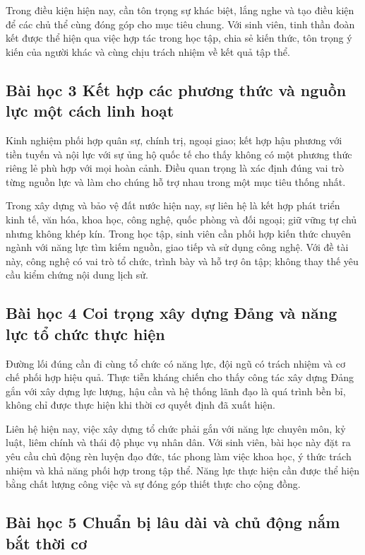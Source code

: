 Trong điều kiện hiện nay, cần tôn trọng sự khác biệt, lắng nghe và tạo điều kiện để các chủ thể cùng đóng góp cho mục tiêu chung. Với sinh viên, tinh thần đoàn kết được thể hiện qua việc hợp tác trong học tập, chia sẻ kiến thức, tôn trọng ý kiến của người khác và cùng chịu trách nhiệm về kết quả tập thể.

\subsection{Bài học 3 Kết hợp các phương thức và nguồn lực một cách linh hoạt}

Kinh nghiệm phối hợp quân sự, chính trị, ngoại giao; kết hợp hậu phương với tiền tuyến và nội lực với sự ủng hộ quốc tế cho thấy không có một phương thức riêng lẻ phù hợp với mọi hoàn cảnh. Điều quan trọng là xác định đúng vai trò từng nguồn lực và làm cho chúng hỗ trợ nhau trong một mục tiêu thống nhất.

Trong xây dựng và bảo vệ đất nước hiện nay, sự liên hệ là kết hợp phát triển kinh tế, văn hóa, khoa học, công nghệ, quốc phòng và đối ngoại; giữ vững tự chủ nhưng không khép kín. Trong học tập, sinh viên cần phối hợp kiến thức chuyên ngành với năng lực tìm kiếm nguồn, giao tiếp và sử dụng công nghệ. Với đề tài này, công nghệ có vai trò tổ chức, trình bày và hỗ trợ ôn tập; không thay thế yêu cầu kiểm chứng nội dung lịch sử.

\subsection{Bài học 4 Coi trọng xây dựng Đảng và năng lực tổ chức thực hiện}

Đường lối đúng cần đi cùng tổ chức có năng lực, đội ngũ có trách nhiệm và cơ chế phối hợp hiệu quả. Thực tiễn kháng chiến cho thấy công tác xây dựng Đảng gắn với xây dựng lực lượng, hậu cần và hệ thống lãnh đạo là quá trình bền bỉ, không chỉ được thực hiện khi thời cơ quyết định đã xuất hiện.

Liên hệ hiện nay, việc xây dựng tổ chức phải gắn với năng lực chuyên môn, kỷ luật, liêm chính và thái độ phục vụ nhân dân. Với sinh viên, bài học này đặt ra yêu cầu chủ động rèn luyện đạo đức, tác phong làm việc khoa học, ý thức trách nhiệm và khả năng phối hợp trong tập thể. Năng lực thực hiện cần được thể hiện bằng chất lượng công việc và sự đóng góp thiết thực cho cộng đồng.

\subsection{Bài học 5 Chuẩn bị lâu dài và chủ động nắm bắt thời cơ}

